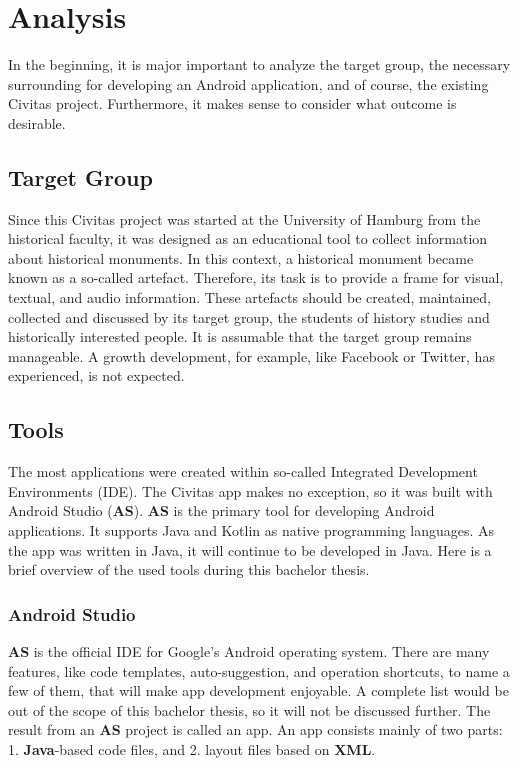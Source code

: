 \newpage
\chapter{Analysis}\label{cap:Analysis}
In the beginning, it is major important to analyze the target group, the necessary surrounding for developing an Android application, and of course, the existing Civitas project. Furthermore, it makes sense to consider what outcome is desirable.

\section{Target Group}
Since this Civitas project was started at the University of Hamburg from the historical faculty, it was designed as an educational tool to collect information about historical monuments. In this context, a historical monument became known as a so-called artefact. Therefore, its task is to provide a frame for visual, textual, and audio information. These artefacts should be created, maintained, collected and discussed by its target group, the students of history studies and historically interested people. It is assumable that the target group remains manageable. A growth development, for example, like Facebook or Twitter, has experienced, is not expected. 


\section{Tools}
The most applications were created within so-called Integrated Development Environments (IDE). The Civitas app makes no exception, so it was built with Android Studio (\textbf{AS}). \textbf{AS} is the primary tool for developing Android applications. It supports Java and Kotlin as native programming languages. As the app was written in Java, it will continue to be developed in Java.
Here is a brief overview of the used tools during this bachelor thesis.

\subsection{Android Studio}
\textbf{AS} is the official IDE for Google's Android operating system. 
There are many features, like code templates, auto-suggestion, and operation shortcuts, to name a few of them, that will make app development enjoyable. A complete list would be out of the scope of this bachelor thesis, so it will not be discussed further. The result from an \textbf{AS} project is called an app. An app consists mainly of two parts: 1. \textbf{Java}-based code files, and 2. layout files based on \textbf{XML}.  

